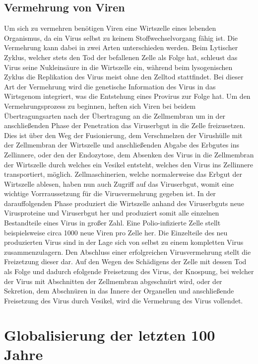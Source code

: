 \documentclass[12pt]{article}
\begin{document}
\subsection{Vermehrung von Viren}
Um sich zu vermehren benötigen Viren eine Wirtszelle eines lebenden Organismus, da ein Virus selbst zu keinem Stoffwechselvorgang fähig ist. Die Vermehrung kann dabei in zwei Arten unterschieden werden. Beim Lytischer Zyklus, welcher stets den Tod der befallenen Zelle als Folge hat, schleust das Virus seine Nukleinsäure in die Wirtszelle ein, während beim lysogenischen Zyklus die Replikation des Virus meist ohne den Zelltod stattfindet. Bei dieser Art der Vermehrung wird die genetische Information des Virus in das Wirtsgenom integriert, was die Entstehung eines Provirus zur Folge hat. Um den Vermehrungsprozess zu beginnen, heften sich Viren bei beidem Übertragungsarten nach der Übertragung an die Zellmembran um in der anschließenden Phase der Penetration das Viruserbgut in die Zelle freizusetzen. Dies ist über den Weg der Fusionierung, dem Verschmelzen der Virushülle mit der Zellmembran der Wirtszelle und anschließenden Abgabe des Erbgutes ins Zellinnere, oder den der Endozytose, dem Absenken des Virus in die Zellmembran der Wirtszelle durch welches ein Vesikel entsteht, welches den Virus ins Zellinnere transportiert, möglich. Zellmaschinerien, welche normalerweise das Erbgut der Wirtszelle ablesen, haben nun auch Zugriff auf das Viruserbgut, womit eine wichtige Vorrraussetzung für die Virusvermehrung gegeben ist. In der darauffolgenden Phase produziert die Wirtszelle anhand des Viruserbguts neue Virusproteine und Viruserbgut her und produziert somit alle einzelnen Bestandteile eines Virus in großer Zahl. Eine Polio-infizierte Zelle stellt beispielsweise circa 1000 neue Viren pro Zelle her. Die Einzelteile des neu produzierten Virus sind in der Lage sich von selbst zu einem kompletten Virus zusammenzulagern. Den Abschluss einer erfolgreichen Virusvermehrung stellt die Freizetzung dieser dar. Auf den Wegen des Schädigens der Zelle mit dessen Tod als Folge und dadurch efolgende Freisetzung des Virus, der Knospung, bei welcher der Virus mit Abschnitten der Zellmembran abgeschnürt wird, oder der Sekretion, dem Abschnüren in das Innere der Organellen und anschließende Freisetzung des Virus durch Vesikel, wird die Vermehrung des Virus vollendet.
\section{Globalisierung der letzten 100 Jahre}
\end{document}
